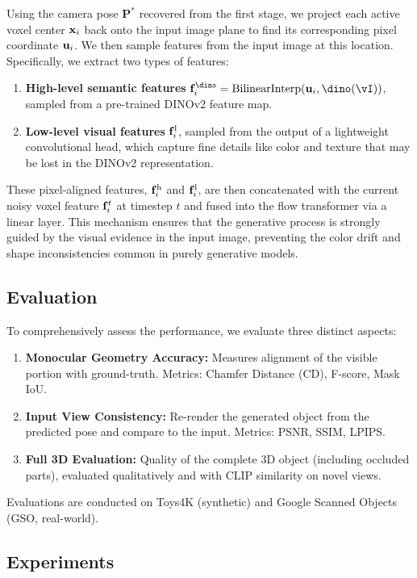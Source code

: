\documentclass[../../book-main.tex]{subfiles}
\begin{document}
Using the camera pose $\mathbf{P}^{*}$ recovered from the first stage, we project each active voxel center $\mathbf{x}_i$ back onto the input image plane to find its corresponding pixel coordinate $\mathbf{u}_i$. We then sample features from the input image at this location. Specifically, we extract two types of features:
\begin{enumerate}
\item \textbf{High-level semantic features} $\feat_i^\dino = \interp(\pixcoord_i, \dino(\image))$, sampled from a pre-trained DINOv2 feature map.
\item \textbf{Low-level visual features} $\mathbf{f}_i^{\mathrm{l}}$, sampled from the output of a lightweight convolutional head, which capture fine details like color and texture that may be lost in the DINOv2 representation.
\end{enumerate}
These pixel-aligned features, $\mathbf{f}_i^{\mathrm{h}}$ and $\mathbf{f}_i^{\mathrm{l}}$, are then concatenated with the current noisy voxel feature $\mathbf{f}_i^{t}$ at timestep $t$ and fused into the flow transformer via a linear layer. This mechanism ensures that the generative process is strongly guided by the visual evidence in the input image, preventing the color drift and shape inconsistencies common in purely generative models.


\subsection{Evaluation}
\label{sub:cupid_evaluation}

To comprehensively assess the performance, we evaluate three distinct aspects:
\begin{enumerate}
\item \textbf{Monocular Geometry Accuracy:} Measures alignment of the visible portion with ground-truth. Metrics: Chamfer Distance (CD), F-score, Mask IoU.
\item \textbf{Input View Consistency:} Re-render the generated object from the predicted pose and compare to the input. Metrics: PSNR, SSIM, LPIPS.
\item \textbf{Full 3D Evaluation:} Quality of the complete 3D object (including occluded parts), evaluated qualitatively and with CLIP similarity on novel views.
\end{enumerate}
Evaluations are conducted on Toys4K (synthetic) and Google Scanned Objects (GSO, real-world).


\subsection{Experiments}
\label{sub:3d_reconstruction_experiments}
\end{document}
